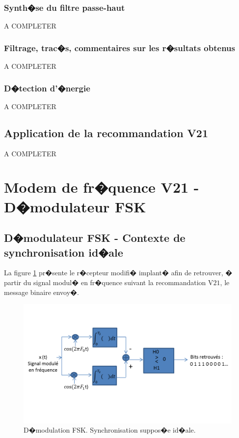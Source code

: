 \documentclass[frenchb]{article}
\begin{document}
        \subsubsection{Synth�se du filtre passe-haut}
        A COMPLETER
        
        \subsubsection{Filtrage, trac�s, commentaires sur les r�sultats obtenus} 
        A COMPLETER

        \subsubsection{D�tection d'�nergie}
         A COMPLETER
         
        \subsection{Application de la recommandation V21}
        A COMPLETER


\section{Modem de fr�quence V21 - D�modulateur FSK}
    \subsection{D�modulateur FSK - Contexte de synchronisation id�ale}
    La figure \ref{fig : demod_FSK} pr�sente le r�cepteur modifi� implant� afin de retrouver, � partir du signal modul� en fr�quence suivant la recommandation V$21$, le message binaire envoy�.
    \begin{figure}[ht!]
        \centering
        \includegraphics[width=12cm]{demod_FSK1.png}
        \caption{D�modulation FSK. Synchronisation suppos�e id�ale. \label{fig : demod_FSK}}
     \end{figure}
\end{document}
